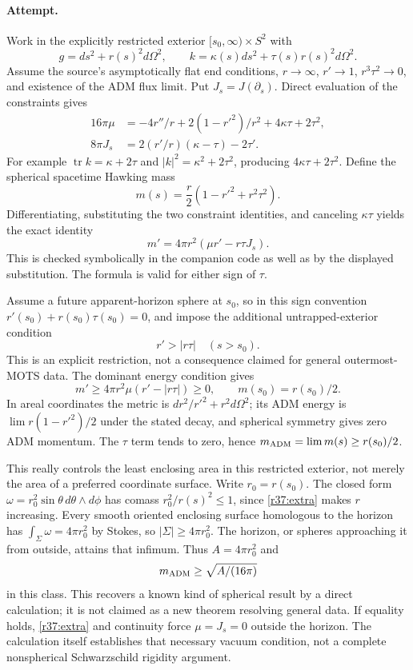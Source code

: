 \documentclass[11pt,a4paper]{article}
\numberwithin{equation}{section}
\begin{document}
\paragraph{Attempt.}
Work in the explicitly restricted exterior $[s_0,\infty)\times S^2$ with
\[
 g=ds^2+r(s)^2d\Omega^2,\qquad
 k=\kappa(s)ds^2+\tau(s)r(s)^2d\Omega^2.
\]
Assume the source's asymptotically flat end conditions, $r\to\infty$,
$r'\to1$, $r^3\tau^2\to0$, and existence of the ADM flux limit. Put
$J_s=J(\partial_s)$. Direct evaluation of the constraints gives
\begin{align*}
16\pi\mu&=-4r''/r+2(1-r'^2)/r^2+4\kappa\tau+2\tau^2,\\
8\pi J_s&=2(r'/r)(\kappa-\tau)-2\tau'.
\end{align*}
For example $\operatorname{tr}k=\kappa+2\tau$ and
$|k|^2=\kappa^2+2\tau^2$, producing $4\kappa\tau+2\tau^2$.
Define the spherical spacetime Hawking mass
\[
 m(s)=\frac r2(1-r'^2+r^2\tau^2).
\]
Differentiating, substituting the two constraint identities, and canceling
$\kappa\tau$ yields the exact identity
\begin{equation}\label{r37:identity}
 m'=4\pi r^2(\mu r'-r\tau J_s).
\end{equation}
This is checked symbolically in the companion code as well as by the displayed
substitution. The formula is valid for either sign of $\tau$.

Assume a future apparent-horizon sphere at $s_0$, so in this sign convention
$r'(s_0)+r(s_0)\tau(s_0)=0$, and impose the additional untrapped-exterior
condition
\begin{equation}\label{r37:extra}
 r'>|r\tau|\quad(s>s_0).
\end{equation}
This is an explicit restriction, not a consequence claimed for general
outermost-MOTS data. The dominant energy condition gives
\[
 m'\ge4\pi r^2\mu(r'-|r\tau|)\ge0,
 \qquad m(s_0)=r(s_0)/2.
\]
In areal coordinates the metric is $dr^2/r'^2+r^2d\Omega^2$; its ADM energy
is $\lim r(1-r'^2)/2$ under the stated decay, and spherical symmetry gives
zero ADM momentum. The $\tau$ term tends to zero, hence
$m_{\rm ADM}=\lim m(s)\ge r(s_0)/2$.

This really controls the least enclosing area in this restricted exterior,
not merely the area of a preferred coordinate surface. Write $r_0=r(s_0)$.
The closed form $\omega=r_0^2\sin\theta\,d\theta\wedge d\phi$ has comass
$r_0^2/r(s)^2\le1$, since \eqref{r37:extra} makes $r$ increasing. Every smooth
oriented enclosing surface homologous to the horizon has
$\int_\Sigma\omega=4\pi r_0^2$ by Stokes, so
$|\Sigma|\ge4\pi r_0^2$. The horizon, or spheres approaching it from outside,
attains that infimum. Thus $A=4\pi r_0^2$ and
\[
 m_{\rm ADM}\ge\sqrt{A/(16\pi)}
\]
in this class. This recovers a known kind of spherical result by a direct
calculation; it is not claimed as a new theorem resolving general data.
If equality holds, \eqref{r37:extra} and continuity force $\mu=J_s=0$ outside
the horizon. The calculation itself establishes that necessary vacuum
condition, not a complete nonspherical Schwarzschild rigidity argument.
\end{document}
